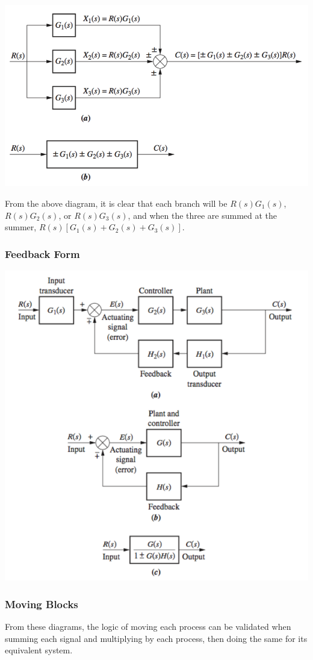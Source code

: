\documentclass[11pt]{article}
\begin{document}
    \begin{center}
        \includegraphics[width=300 px]{img/parallel} \\
    \end{center}

    From the above diagram, it is clear that each branch will be $R(s)G_1(s)$, $R(s)G_2(s)$, or $R(s)G_3(s)$, and when the three are summed at the summer, $R(s)[G_1(s) + G_2(s) + G_3(s)]$. 

    \subsubsection{Feedback Form}

    \begin{center}
        \includegraphics[width=300 px]{img/feedback} \\
    \end{center}

    \subsubsection{Moving Blocks}

    From these diagrams, the logic of moving each process can be validated when summing each signal and multiplying by each process, then doing the same for its equivalent system. \\
    
\end{document}

